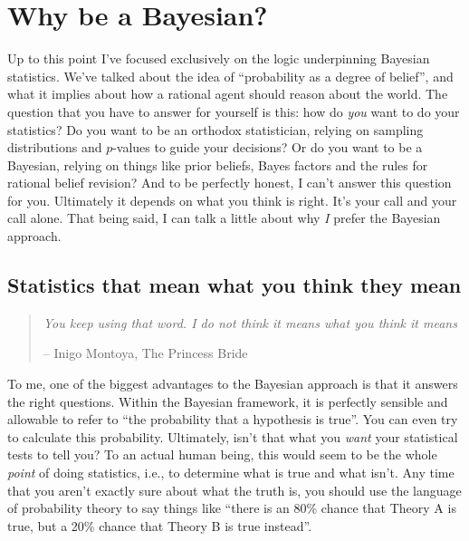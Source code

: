 \section{Why be a Bayesian?\label{sec:whybayes}}

Up to this point I've focused exclusively on the logic underpinning Bayesian statistics. We've talked about the idea of ``probability as a degree of belief'', and what it implies about how a rational agent should reason about the world. The question that you have to answer for yourself is this: how do {\it you} want to do your statistics? Do you want to be an orthodox statistician, relying on sampling distributions and $p$-values to guide your decisions? Or do you want to be a Bayesian, relying on things like prior beliefs, Bayes factors and the rules for rational belief revision? And to be perfectly honest, I can't answer this question for you. Ultimately it depends on what you think is right. It's your call and your call alone. That being said, I can talk a little about why {\it I} prefer the Bayesian approach. 

\subsection{Statistics that mean what you think they mean}

\begin{quote}
{\it You keep using that word. I do not think it means what you think it means} 

\hspace*{2cm} -- Inigo Montoya, The Princess Bride
\end{quote}

To me, one of the biggest advantages to the Bayesian approach is that it answers the right questions. Within the Bayesian framework, it is perfectly sensible and allowable to refer to ``the probability that a hypothesis is true''. You can even try to calculate this probability. Ultimately, isn't that what you {\it want} your statistical tests to tell you? To an actual human being, this would seem to be the whole {\it point} of doing statistics, i.e., to determine what is true and what isn't. Any time that you aren't exactly sure about what the truth is, you should use the language of probability theory to say things like ``there is an 80\% chance that Theory A is true, but a 20\% chance that Theory B is true instead''. 

